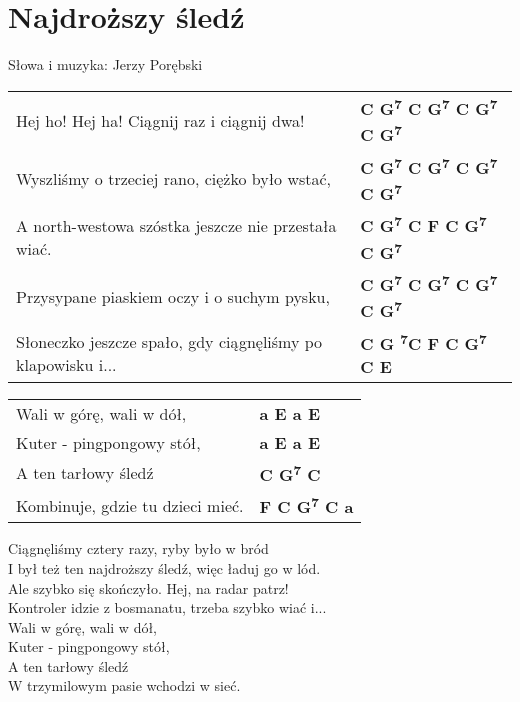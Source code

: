 \section{Najdroższy śledź}

Słowa i muzyka: Jerzy Porębski

\vspace{2em}
\begin{tabular}{@{}p{10cm}@{}l@{}}
Hej ho! Hej ha! Ciągnij raz i ciągnij dwa! & \bfseries C G\textsuperscript{7} C G\textsuperscript{7} C G\textsuperscript{7} C G\textsuperscript{7}\\
Wyszliśmy o trzeciej rano, ciężko było wstać, & \bfseries C G\textsuperscript{7} C G\textsuperscript{7} C G\textsuperscript{7} C G\textsuperscript{7}\\
A north-westowa szóstka jeszcze nie przestała wiać. & \bfseries C G\textsuperscript{7} C F C G\textsuperscript{7} C G\textsuperscript{7}\\
Przysypane piaskiem oczy i o suchym pysku, & \bfseries C G\textsuperscript{7} C G\textsuperscript{7} C G\textsuperscript{7} C G\textsuperscript{7}\\
Słoneczko jeszcze spało, gdy ciągnęliśmy po klapowisku i... & \bfseries C G \textsuperscript{7}C F C G\textsuperscript{7} C E\\
\end{tabular}

\vspace{1em}
\begin{tabular}{@{}p{10cm}@{}l@{}}
Wali w górę, wali w dół, & \bfseries a E a E\\
Kuter - pingpongowy stół, & \bfseries a E a E\\
A ten tarłowy śledź & \bfseries C G\textsuperscript{7} C\\
Kombinuje, gdzie tu dzieci mieć. & \bfseries F C G\textsuperscript{7} C a\\
\end{tabular}

\vspace{1em}
Ciągnęliśmy cztery razy, ryby było w bród \\
I był też ten najdroższy śledź, więc ładuj go w lód. \\
Ale szybko się skończyło. Hej, na radar patrz! \\
Kontroler idzie z bosmanatu, trzeba szybko wiać i... \\

Wali w górę, wali w dół, \\
Kuter - pingpongowy stół, \\
A ten tarłowy śledź \\
W trzymilowym pasie wchodzi w sieć. \\

